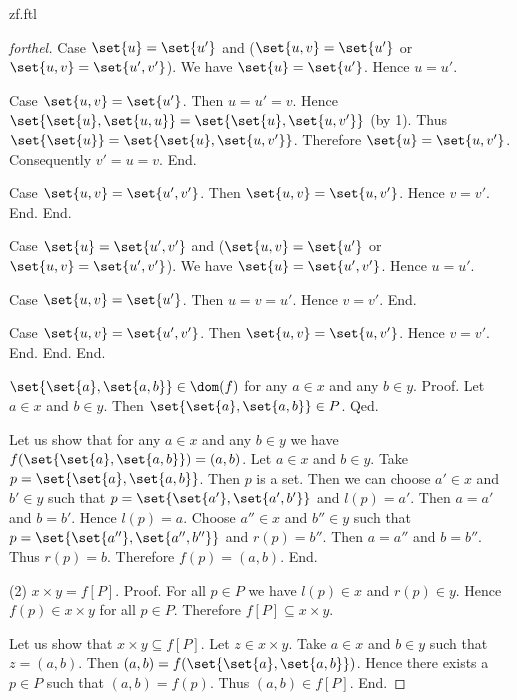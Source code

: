 \documentclass{naproche-library}
\begin{document}
\begin{smodule}{zf.ftl}
\begin{proof}[forthel]
      Case $\set{u} = \set{u'}$ and ($\set{u,v} = \set{u'}$ or $\set{u,v} = \set{u',v'}$).
        We have $\set{u} = \set{u'}$.
        Hence $u = u'$.

        Case $\set{u,v} = \set{u'}$.
          Then $u = u'= v$.
          Hence $\set{\set{u}, \set{u,u}} = \set{\set{u}, \set{u,v'}}$ (by 1).
          Thus $\set{\set{u}} = \set{\set{u}, \set{u,v'}}$.
          Therefore $\set{u} = \set{u,v'}$.
          Consequently $v' = u = v$.
        End.

        Case $\set{u,v} = \set{u',v'}$.
          Then $\set{u,v} = \set{u,v'}$.
          Hence $v = v'$.
        End.
      End.

      Case $\set{u} = \set{u',v'}$ and ($\set{u,v} = \set{u'}$ or $\set{u,v} = \set{u',v'}$).
        We have $\set{u} = \set{u',v'}$.
        Hence $u = u'$.

        Case $\set{u,v} = \set{u'}$.
          Then $u = v = u'$.
          Hence $v = v'$.
        End.

        Case $\set{u,v} = \set{u',v'}$.
          Then $\set{u,v} = \set{u,v'}$.
          Hence $v = v'$.
        End.
      End.
    End.

    $\set{\set{a}, \set{a,b}} \in \dom(f)$ for any $a \in x$ and any $b \in y$. \newline %
    Proof.
      Let $a \in x$ and $b \in y$.
      Then $\set{\set{a}, \set{a,b}} \in P$.
    Qed.

    Let us show that for any $a \in x$ and any $b \in y$ we have $f(\set{\set{a}, \set{a,b}}) = (a,b)$.
      Let $a \in x$ and $b \in y$.
      Take $p = \set{\set{a}, \set{a,b}}$.
      Then $p$ is a set.
      Then we can choose $a' \in x$ and $b' \in y$ such that $p = \set{\set{a'}, \set{a',b'}}$ and $l(p) = a'$.
      Then $a = a'$ and $b = b'$.
      Hence $l(p) = a$.
      Choose $a'' \in x$ and $b'' \in y$ such that $p = \set{\set{a''}, \set{a'',b''}}$ and $r(p) = b''$.
      Then $a = a''$ and $b = b''$.
      Thus $r(p) = b$.
      Therefore $f(p) = (a,b)$.
    End.

    (2) $x \times y = f[P]$. \newline
    Proof.
      For all $p \in P$ we have $l(p) \in x$ and $r(p) \in y$.
      Hence $f(p) \in x \times y$ for all $p \in P$.
      Therefore $f[P] \subseteq x \times y$.

      Let us show that $x \times y \subseteq f[P]$.
        Let $z \in x \times y$.
        Take $a \in x$ and $b \in y$ such that $z = (a,b)$.
        Then $(a,b) = f(\set{\set{a}, \set{a,b}})$.
        Hence there exists a $p \in P$ such that $(a,b) = f(p)$.
        Thus $(a,b) \in f[P]$.
      End.


\end{proof}
\end{smodule}
\end{document}
